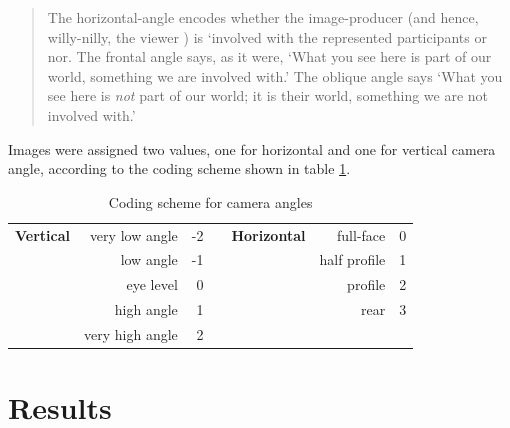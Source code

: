 \begin{quote}
The horizontal-angle encodes whether the image-producer (and hence, willy-nilly, the viewer ) is `involved with the represented participants or nor. The frontal angle says, as it were, `What you see here is part of our world, something we are involved with.' The oblique angle says `What you see here is \textit{not} part of our world; it is their world, something we are not involved with.' \citep[136, original emphasis]{Kress:1996} 
\end{quote}

\bigskip

Images were assigned two values, one for horizontal and one for vertical camera angle, according to the coding scheme shown in table \ref{coding:camang}.

\begin{table}
\centering
\sffamily

\begin{tabular}{rr|rrrr|r}
\textbf{Vertical }& very low angle &         -2 &            & \textbf{Horizontal }&  full-face &          0 \\
           &  low angle &         -1 &            &            & half profile &          1 \\
           &  eye level &          0 &            &            &    profile &          2 \\
           & high angle &          1 &            &            &       rear &          3 \\
          & very high angle &          2 &            &            &            &            \\
\end{tabular}

\caption[Coding: Camera angles]{Coding scheme for camera angles}
\label{coding:camang}
\end{table} 

\section{Results}


